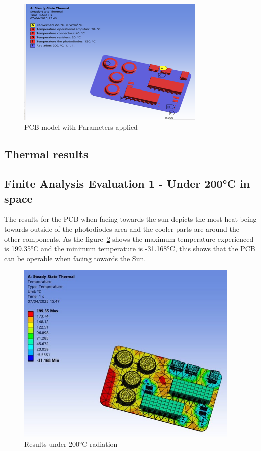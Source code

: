 \begin{figure}[H]
    \centering
    \includegraphics[width=0.8\textwidth]{chapters/methodology/ThermalAnalysis/Fig1parameters.png}
    \caption{PCB model with Parameters applied}
    \label{fig:PCBparameters}
\end{figure}

\subsection{Thermal results}

\subsection{Finite Analysis Evaluation 1 - Under 200°C in space}

The results for the PCB when facing towards the sun
depicts the most heat being towards outside of the photodiodes area and
the cooler parts are around the other components. As the figure~\ref{fig:results_200C}
shows the maximum temperature experienced is 199.35°C and the minimum
temperature is -31.168°C, this shows that the PCB can be operable when
facing towards the Sun.

\begin{figure}[H]
    \centering
    \includegraphics[width=0.95\textwidth]{chapters/methodology/ThermalAnalysis/Fig2under200C.jpg}
    \caption{Results under 200°C radiation}
    \label{fig:results_200C}
\end{figure}




